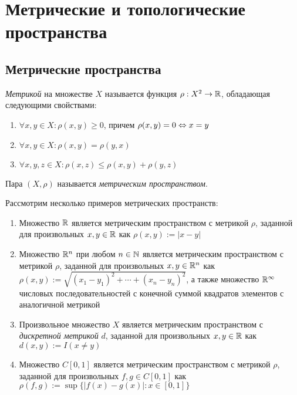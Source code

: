 \section{Метрические и топологические пространства}

\subsection{Метрические пространства}

\begin{definition}
	\textit{Метрикой} на множестве $X$ называется функция $\rho : X^2 \to \mathbb{R}$, обладающая следующими свойствами:
	\begin{enumerate}
		\item $\forall x, y \in X: \rho(x, y) \ge 0$, причем $\rho(x, y) = 0 \Leftrightarrow x = y$
		\item $\forall x, y \in X: \rho(x, y) = \rho(y, x)$
		\item $\forall x, y, z \in X: \rho(x, z) \le \rho(x, y) + \rho(y, z)$
	\end{enumerate}
	
	Пара $(X, \rho)$ называется \textit{метрическим пространством}.
\end{definition}

\begin{example}
	Рассмотрим несколько примеров метрических пространств:
	\begin{enumerate}
		\item Множество $\mathbb{R}$ является метрическим пространством с метрикой $\rho$, заданной для произвольных $x, y \in \mathbb{R}$ как $\rho(x, y) := |x - y|$
		
		\item Множество $\mathbb{R}^n$ при любом $n \in \mathbb{N}$ является метрическим пространством с метрикой $\rho$, заданной для произвольных $x, y \in \mathbb{R}^n$ как $\rho(x, y) := \sqrt{(x_1 - y_1)^2 + \dotsb + (x_n - y_n)^2}$, а также множество $\mathbb{R}^\infty$ числовых последовательностей с конечной суммой квадратов элементов с аналогичной метрикой
		
		\item Произвольное множество $X$ является метрическим пространством с \textit{дискретной метрикой} $d$, заданной для произвольных $x, y \in \mathbb{R}$ как $d(x, y) := I(x \ne y)$
		
		\item Множество $C[0, 1]$ является метрическим пространством с метрикой $\rho$, заданной для произвольных $f, g \in C[0, 1]$ как $\rho(f, g) := \sup\{|f(x) - g(x)| : x \in [0, 1]\}$
	\end{enumerate}
\end{example}

